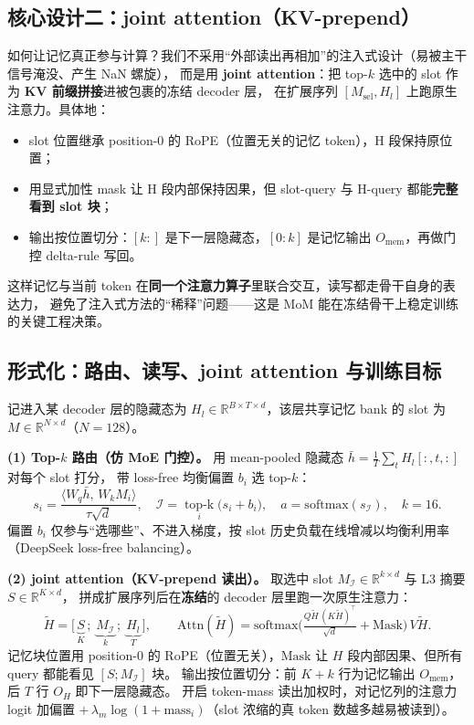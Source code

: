 \documentclass[11pt,a4paper]{ctexart}
\begin{document}
\subsection{核心设计二：joint attention（KV-prepend）}
如何让记忆真正参与计算？我们不采用“外部读出再相加”的注入式设计（易被主干信号淹没、产生 NaN 螺旋），
而是用 \textbf{joint attention}：把 top-$k$ 选中的 slot 作为 \textbf{KV 前缀拼接}进被包裹的冻结 decoder 层，
在扩展序列 $[M_{\text{sel}}, H_l]$ 上跑原生注意力。具体地：
\begin{itemize}
  \item slot 位置继承 position-0 的 RoPE（位置无关的记忆 token），H 段保持原位置；
  \item 用显式加性 mask 让 H 段内部保持因果，但 slot-query 与 H-query 都能\textbf{完整看到 slot 块}；
  \item 输出按位置切分：$[k:]$ 是下一层隐藏态，$[0:k]$ 是记忆输出 $O_{\text{mem}}$，再做门控 delta-rule 写回。
\end{itemize}
这样记忆与当前 token 在\textbf{同一个注意力算子}里联合交互，读写都走骨干自身的表达力，
避免了注入式方法的“稀释”问题——这是 MoM 能在冻结骨干上稳定训练的关键工程决策。

\subsection{形式化：路由、读写、joint attention 与训练目标}
记进入某 decoder 层的隐藏态为 $H_l\in\mathbb{R}^{B\times T\times d}$，该层共享记忆 bank 的 slot 为 $M\in\mathbb{R}^{N\times d}$（$N{=}128$）。

\noindent\textbf{(1) Top-$k$ 路由（仿 MoE 门控）。} 用 mean-pooled 隐藏态 $\bar h=\frac1T\sum_t H_l[:,t,:]$ 对每个 slot 打分，
带 loss-free 均衡偏置 $b_i$ 选 top-$k$：
\begin{equation*}
s_i=\frac{\langle W_q\bar h,\,W_k M_i\rangle}{\tau\sqrt{d}},\quad
\mathcal{I}=\operatorname*{top\text{-}k}_i\big(s_i+b_i\big),\quad
a=\mathrm{softmax}(s_{\mathcal I}),\quad k{=}16 .
\end{equation*}
偏置 $b_i$ 仅参与“选哪些”、不进入梯度，按 slot 历史负载在线增减以均衡利用率（DeepSeek loss-free balancing）。

\noindent\textbf{(2) joint attention（KV-prepend 读出）。} 取选中 slot $M_{\mathcal I}\in\mathbb{R}^{k\times d}$ 与 L3 摘要 $S\in\mathbb{R}^{K\times d}$，
拼成扩展序列后在\textbf{冻结}的 decoder 层里跑一次原生注意力：
\begin{equation*}
\tilde H=\big[\,\underbrace{S}_{K}\,;\;\underbrace{M_{\mathcal I}}_{k}\,;\;\underbrace{H_l}_{T}\,\big],\qquad
\mathrm{Attn}(\tilde H)=\mathrm{softmax}\!\Big(\tfrac{Q\tilde H\,(K\tilde H)^\top}{\sqrt{d}}+\mathrm{Mask}\Big)\,V\tilde H .
\end{equation*}
记忆块位置用 position-0 的 RoPE（位置无关），$\mathrm{Mask}$ 让 $H$ 段内部因果、但所有 query 都能看见 $[S;M_{\mathcal I}]$ 块。
输出按位置切分：前 $K{+}k$ 行为记忆输出 $O_{\text{mem}}$，后 $T$ 行 $O_{H}$ 即下一层隐藏态。
开启 token-mass 读出加权时，对记忆列的注意力 logit 加偏置 $+\,\lambda_m\log(1{+}\text{mass}_i)$（slot 浓缩的真 token 数越多越易被读到）。
\end{document}
